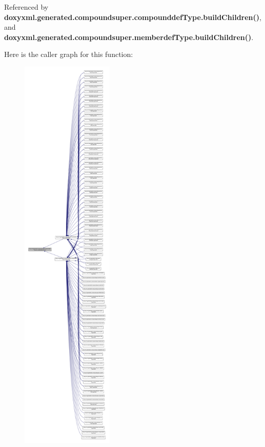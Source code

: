 Referenced by {\bf doxyxml.\+generated.\+compoundsuper.\+compounddef\+Type.\+build\+Children()}, and {\bf doxyxml.\+generated.\+compoundsuper.\+memberdef\+Type.\+build\+Children()}.



Here is the caller graph for this function\+:
\nopagebreak
\begin{figure}[H]
\begin{center}
\leavevmode
\includegraphics[height=550pt]{dc/d6a/classdoxyxml_1_1generated_1_1compoundsuper_1_1compounddefType_af812f14954562f23127a178fe92c7804_icgraph}
\end{center}
\end{figure}


